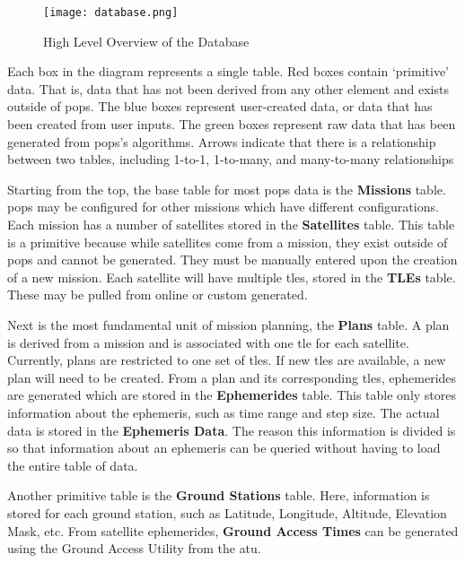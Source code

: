 \begin{figure}
    \centering
    \texttt{[image: database.png]} 
    \caption{High Level Overview of the Database}
    \label{fig:database} 
\end{figure}

Each box in the diagram represents a single table. Red boxes contain
`primitive' data. That is, data that has not been derived from any other
element and exists outside of \gls{pops}. The blue boxes represent user-created
data, or data that has been created from user inputs. The green boxes represent
raw data that has been generated from \gls{pops}'s algorithms. Arrows indicate
that there is a relationship between two tables, including 1-to-1, 1-to-many,
and many-to-many relationships

Starting from the top, the base table for most \gls{pops} data is the
\textbf{Missions} table. \gls{pops} may be configured for other missions which
have different configurations. Each mission has a number of satellites stored
in the \textbf{Satellites} table. This table is a primitive because while
satellites come from a mission, they exist outside of \gls{pops} and cannot be
generated. They must be manually entered upon the creation of a new mission.
Each satellite will have multiple \glspl{tle}, stored in the \textbf{TLEs}
table. These may be pulled from online or custom generated.

Next is the most fundamental unit of mission planning, the \textbf{Plans}
table. A plan is derived from a mission and is associated with one \gls{tle}
for each satellite. Currently, plans are restricted to one set of \glspl{tle}.
If new \glspl{tle} are available, a new plan will need to be created.  From a
plan and its corresponding \glspl{tle}, ephemerides are generated which are
stored in the \textbf{Ephemerides} table. This table only stores information
about the ephemeris, such as time range and step size. The actual data is
stored in the \textbf{Ephemeris Data}. The reason this information is divided
is so that information about an ephemeris can be queried without having to load
the entire table of data.

Another primitive table is the \textbf{Ground Stations} table. Here, information
is stored for each ground station, such as Latitude, Longitude, Altitude,
Elevation Mask, etc. From satellite ephemerides, \textbf{Ground Access Times}
can be generated using the Ground Access Utility from the \gls{atu}.

